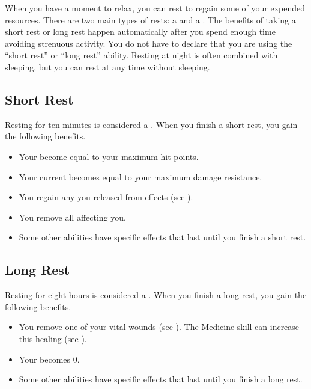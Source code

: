 
  When you have a moment to relax, you can rest to regain some of your expended resources.
  There are two main types of rests: a  and a .
  The benefits of taking a short rest or long rest happen automatically after you spend enough time avoiding strenuous activity.
  You do not have to declare that you are using the ``short rest'' or ``long rest'' ability.
  Resting at night is often combined with sleeping, but you can rest at any time without sleeping.


  \subsection{Short Rest}\label{Short Rest}
    Resting for ten minutes is considered a .
    When you finish a short rest, you gain the following benefits.
    \begin{itemize}
      \item Your  become equal to your maximum hit points.
      \item Your current  becomes equal to your maximum damage resistance.
      \item You regain any  you released from  effects (see ).
      \item You remove all  affecting you.
      \item Some other abilities have specific effects that last until you finish a short rest.
    \end{itemize}

  \subsection{Long Rest}\label{Long Rest}
    Resting for eight hours is considered a .
    When you finish a long rest, you gain the following benefits.
    \begin{itemize}
      \item You remove one of your vital wounds (see ).
        The Medicine skill can increase this healing (see ).
      \item Your  becomes 0.
      \item Some other abilities have specific effects that last until you finish a long rest.
    \end{itemize}

